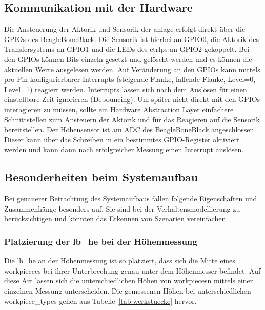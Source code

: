 \subsection{Kommunikation mit der Hardware}

Die Ansteuerung der Aktorik und Sensorik der \gls{anlage} erfolgt direkt über die GPIOs des BeagleBoneBlack.
Die Sensorik ist hierbei an GPIO0, die Aktorik des Transfersystems an GPIO1 und die LEDs des \gls{ctrlp}s an GPIO2
gekoppelt.
Bei den GPIOs können Bits einzeln gesetzt und gelöscht werden und es können die aktuellen Werte ausgelesen werden.
Auf Veränderung an den GPIOs kann mittels pro Pin konfigurierbarer Interrupts (steigende Flanke, fallende Flanke,
Level=0, Level=1) reagiert werden.
Interrupts lassen sich nach dem Auslösen für einen einstellbare Zeit ignorieren (Debouncing).
Um später nicht direkt mit den GPIOs interagieren zu müssen, sollte ein Hardware Abstraction Layer
einfachere Schnittstellen zum Ansteuern der Aktorik und für das Reagieren auf die Sensorik bereitstellen.
Der Höhensensor ist am ADC des BeagleBoneBlack angeschlossen. Dieser kann über das Schreiben in ein
bestimmtes GPIO-Register aktiviert werden und kann dann nach erfolgreicher Messung einen Interrupt auslösen.

\subsection{Besonderheiten beim Systemaufbau}

Bei genauerer Betrachtung des Systemaufbaus fallen folgende Eigenschaften und Zusammenhänge besonders auf.
Sie sind bei der Verhaltensmodellierung zu berücksichtigen und könnten das Erkennen von Szenarien vereinfachen.

\subsubsection{Platzierung der \gls{lb_he} bei der Höhenmessung}

Die \gls{lb_he} an der Höhenmessung ist so platziert, dass sich die Mitte eines \Gls{workpiece}es bei ihrer
Unterbrechung genau unter dem Höhenmesser befindet.
Auf diese Art lassen sich die unterschiedlichen Höhen von \Glspl{workpiece}n mittels einer einzelnen Messung unterscheiden.
Die gemessenen Höhen bei unterschiedlichen \glspl{workpiece_type} gehen aus Tabelle~\ref{tab:werkstuecke} hervor.

